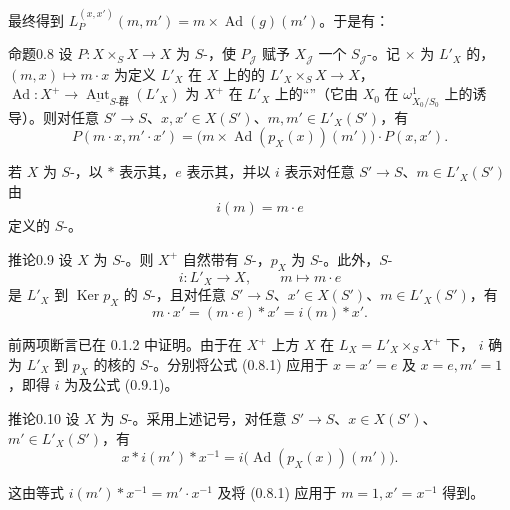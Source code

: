 最终得到 $L_P^{(x,x')}(m,m')=m\times\operatorname{Ad}(g)(m')$。于是有：
\begin{SGAresult}{命题}{0.8}
设 $P:X\times_S X\to X$ 为 $S$-，使 $P_{\mathcal J}$ 赋予 $X_{\mathcal J}$ 一个 $S_{\mathcal J}$-。记 $\times$ 为 $L'_X$ 的，$(m,x)\mapsto m\cdot x$ 为定义 $L'_X$ 在 $X$ 上的的 $L'_X\times_S X\to X$，$\operatorname{Ad}:X^+\to\underline{\operatorname{Aut}}_{S\text{-群}}(L'_X)$ 为 $X^+$ 在 $L'_X$ 上的“”（它由 $X_0$ 在 $\omega^1_{X_0/S_0}$ 上的诱导）。则对任意 $S'\to S$、$x,x'\in X(S')$、$m,m'\in L'_X(S')$，有
\[P(m\cdot x,m'\cdot x')=\bigl(m\times\operatorname{Ad}(p_X(x))(m')\bigr)\cdot P(x,x').\tag{0.8.1}\]
\end{SGAresult}
若 $X$ 为 $S$-，以 $*$ 表示其，$e$ 表示其，并以 $i$ 表示对任意 $S'\to S$、$m\in L'_X(S')$ 由
\[i(m)=m\cdot e\]
定义的 $S$-。
\begin{SGAresult}{推论}{0.9}
设 $X$ 为 $S$-。则 $X^+$ 自然带有 $S$-，$p_X$ 为 $S$-。此外，$S$-
\[i:L'_X\longrightarrow X,\qquad m\longmapsto m\cdot e\]
是 $L'_X$ 到 $\operatorname{Ker}p_X$ 的 $S$-，且对任意 $S'\to S$、$x'\in X(S')$、$m\in L'_X(S')$，有
\[m\cdot x'=(m\cdot e)*x'=i(m)*x'.\tag{0.9.1}\]
\end{SGAresult}
前两项断言已在 0.1.2 中证明。由于在 $X^+$ 上方 $X$ 在 $L_X=L'_X\times_S X^+$ 下， $i$ 确为 $L'_X$ 到 $p_X$ 的核的 $S$-。分别将公式 (0.8.1) 应用于 $x=x'=e$ 及 $x=e,m'=1$，即得 $i$ 为及公式 (0.9.1)。
\begin{SGAresult}{推论}{0.10}
设 $X$ 为 $S$-。采用上述记号，对任意 $S'\to S$、$x\in X(S')$、$m'\in L'_X(S')$，有
\[x*i(m')*x^{-1}=i\bigl(\operatorname{Ad}(p_X(x))(m')\bigr).\tag{0.10.1}\]
\end{SGAresult}
这由等式 $i(m')*x^{-1}=m'\cdot x^{-1}$ 及将 (0.8.1) 应用于 $m=1,x'=x^{-1}$ 得到。

